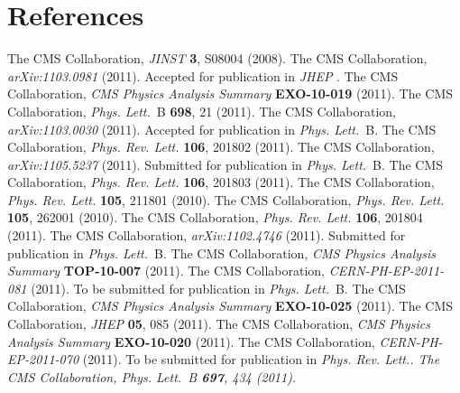 \documentclass[11pt]{article}
\def\Journal#1#2#3#4{{#1} {\bf #2}, #3 (#4)}
\def\PLB{{\em Phys. Lett.}~B}
\def\PRL{\em Phys. Rev. Lett.}
\def\PRD{{\em Phys. Rev.}~D}
\def\JINST{{\em JINST} }
\def\JHEP{{\em JHEP} }
\begin{document}
\section*{References}
\begin{thebibliography}{99}

The CMS Collaboration, \Journal{\JINST}{3}{S08004}{2008}.
The CMS Collaboration, {\em arXiv:1103.0981} (2011). Accepted for publication in \JHEP.
The CMS Collaboration, {\em CMS Physics Analysis Summary} {\bf EXO-10-019} (2011).
The CMS Collaboration, \Journal{\PLB}{698}{21}{2011}.
The CMS Collaboration, {\em arXiv:1103.0030} (2011). Accepted for publication in \PLB.
The CMS Collaboration, \Journal{\PRL}{106}{201802}{2011}.
The CMS Collaboration, {\em arXiv:1105.5237} (2011). Submitted for publication in \PLB.
The CMS Collaboration, \Journal{\PRL}{106}{201803}{2011}.
The CMS Collaboration, \Journal{\PRL}{105}{211801}{2010}.
The CMS Collaboration, \Journal{\PRL}{105}{262001}{2010}.
The CMS Collaboration, \Journal{\PRL}{106}{201804}{2011}.
The CMS Collaboration, {\em arXiv:1102.4746} (2011). Submitted for publication in \PLB.
The CMS Collaboration, {\em CMS Physics Analysis Summary} {\bf TOP-10-007} (2011).
The CMS Collaboration, {\em CERN-PH-EP-2011-081} (2011). To be submitted for publication in \PLB.
The CMS Collaboration, {\em CMS Physics Analysis Summary} {\bf EXO-10-025} (2011).
The CMS Collaboration, \Journal{\JHEP}{05}{085}{2011}.
The CMS Collaboration, {\em CMS Physics Analysis Summary} {\bf EXO-10-020} (2011).
The CMS Collaboration, {\em CERN-PH-EP-2011-070} (2011). To be submitted for publication in \PRL.
The CMS Collaboration, \Journal{\PLB}{697}{434}{2011}.



\end{thebibliography}
\end{document}
